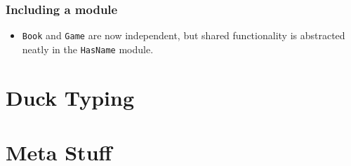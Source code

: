 \documentclass{beamer}
\begin{document}
\begin{frame}[fragile]
  \frametitle{Including a module}
  \begin{semiverbatim}
  \end{semiverbatim}

  \begin{itemize}
    \item \texttt{Book} and \texttt{Game} are now independent, but shared functionality is abstracted neatly in the \texttt{HasName} module.
  \end{itemize}
\end{frame}

\section{Duck Typing}
\begin{frame}
\end{frame}

\section{Meta Stuff}
\begin{frame}
\end{frame}
\end{document}
